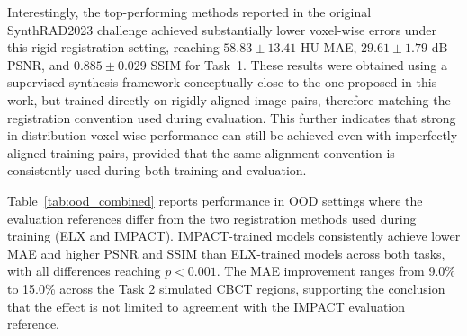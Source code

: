 \documentclass[lettersize,journal]{IEEEtran}
\begin{document}
Interestingly, the top-performing methods reported in the original SynthRAD2023 challenge achieved substantially lower voxel-wise errors under this rigid-registration setting, reaching $58.83 \pm 13.41$ HU MAE, $29.61 \pm 1.79$ dB PSNR, and $0.885 \pm 0.029$ SSIM for Task~1. These results were obtained using a supervised synthesis framework conceptually close to the one proposed in this work, but trained directly on rigidly aligned image pairs, therefore matching the registration convention used during evaluation. This further indicates that strong in-distribution voxel-wise performance can still be achieved even with imperfectly aligned training pairs, provided that the same alignment convention is consistently used during both training and evaluation.

Table~\ref{tab:ood_combined} reports performance in OOD settings where the evaluation references differ from the two registration methods used during training (ELX and IMPACT). IMPACT-trained models consistently achieve lower MAE and higher PSNR and SSIM than ELX-trained models across both tasks, with all differences reaching $p<0.001$. The MAE improvement ranges from 9.0\% to 15.0\% across the Task 2 simulated CBCT regions, supporting the conclusion that the effect is not limited to agreement with the IMPACT evaluation reference.
\end{document}
